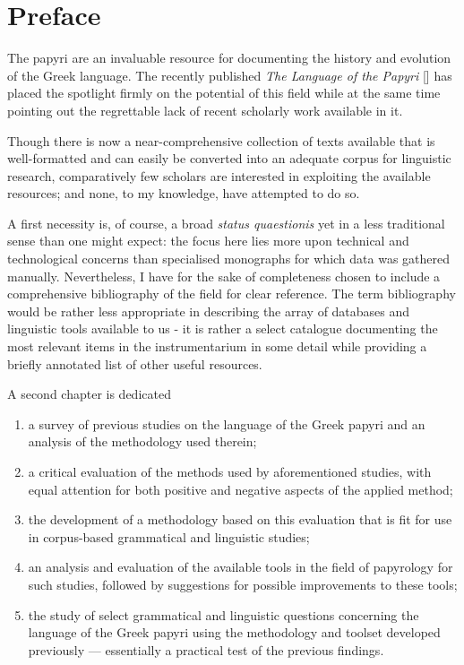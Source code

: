 \chapter{Preface}
\label{chap:preface}
\mtcaddchapter

The papyri are an invaluable resource for documenting the history and evolution
of the Greek language. The recently published \emph{The Language of the Papyri}
[\cite{lpapyri}] has placed the spotlight firmly on the potential of this field
while at the same time pointing out the regrettable lack of recent scholarly
work available in it.

Though there is now a near-comprehensive collection of texts available that is
well-formatted and can easily be converted into an adequate corpus for
linguistic research, comparatively few scholars are interested in exploiting
the available resources; and none, to my knowledge, have attempted to do so.

A first necessity is, of course, a broad \emph{status quaestionis} yet in a
less traditional sense than one might expect: the focus here lies more upon
technical and technological concerns than specialised monographs for which data
was gathered manually. Nevertheless, I have for the sake of completeness chosen
to include a comprehensive bibliography of the field for clear reference. The
term bibliography would be rather less appropriate in describing the array of
databases and linguistic tools available to us - it is rather a select
catalogue documenting the most relevant items in the instrumentarium in some
detail while providing a briefly annotated list of other useful resources.

A second chapter is dedicated

\begin{enumerate}
\item a survey of previous studies on the language of the Greek papyri 
and an analysis of the methodology used therein;
\item a critical evaluation of the methods used by aforementioned 
studies, with equal attention for both positive and negative aspects of 
the applied method;
\item the development of a methodology based on this evaluation that is 
fit for use in corpus-based grammatical and linguistic studies;
\item an analysis and evaluation of the available tools in the field of 
papyrology for such studies, followed by suggestions for possible 
improvements to these tools;
\item the study of select grammatical and linguistic questions 
concerning the language of the Greek papyri using the methodology and 
toolset developed previously — essentially a practical test of the 
previous findings.
\end{enumerate}

